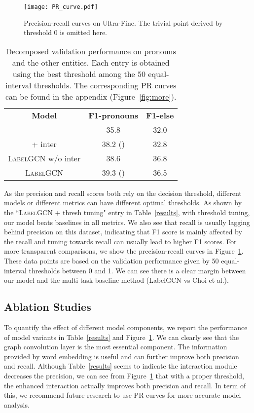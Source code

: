 \documentclass[11pt,a4paper]{article}
\begin{document}
\begin{figure}[t]
\centering
\texttt{[image: PR\_curve.pdf]}
\caption{Precision-recall curves on Ultra-Fine. The trivial point derived by threshold 0 is omitted here.}
\label{pr}
\end{figure}

\begin{table}[t]
    \centering
    \small
    \begin{tabular}{c|cc}
    \toprule
        \textbf{Model} & \textbf{F1-pronouns} & \textbf{F1-else}\\
        \citet{choi2018ultra} & 35.8 & 32.0 \\ 
        \citet{choi2018ultra} + inter & 38.2 () & 32.8 \\
        \midrule
        \textsc{LabelGCN} w/o inter & 38.6 & 36.8 \\
        \textsc{LabelGCN} & 39.3 () & 36.5\\
        \bottomrule
    \end{tabular}
    \caption{Decomposed validation performance on pronouns and the other entities. Each entry is obtained using the best threshold among the 50 equal-interval thresholds. The corresponding PR curves can be found in the appendix (Figure~\ref{fig:more}).}
    \label{tab:interaction}
    \vspace{-0.1in}
\end{table}

As the precision and recall scores both rely on the decision threshold, different models or different metrics can have different optimal thresholds. As shown by the ``\textsc{LabelGCN} + thresh tuning" entry in Table~\ref{results}, with threshold tuning, our model beats baselines in all metrics. We also see that recall is usually lagging behind precision on this dataset, indicating that F1 score is mainly affected by the recall and tuning towards recall can usually lead to higher F1 scores. For more transparent comparisons, we show the precision-recall curves in Figure~\ref{pr}. These data points are based on the validation performance given by 50 equal-interval thresholds between 0 and 1. We can see there is a clear margin between our model and the multi-task baseline method (LabelGCN vs Choi et al.).

\subsection{Ablation Studies}
To quantify the effect of different model components, we report the performance of model variants in Table~\ref{results} and Figure~\ref{pr}. We can clearly see that the graph convolution layer is the most essential component. The information provided by word embedding is useful and can further improve both precision and recall.
Although Table~\ref{results} seems to indicate the interaction module decreases the precision, we can see from Figure~\ref{pr} that with a proper threshold, the enhanced interaction actually improves both precision and recall.
In term of this, we recommend future research to use PR curves for more accurate model analysis.
\end{document}
